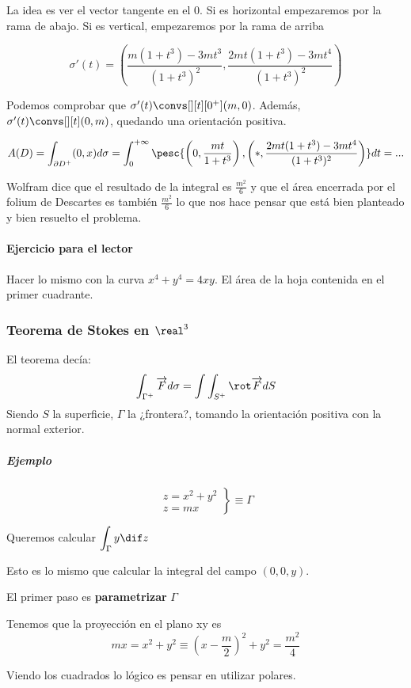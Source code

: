 La idea es ver el vector tangente en el 0. Si es horizontal empezaremos por la rama de abajo. Si es vertical, empezaremos por la rama de arriba

\[\sigma'(t) = \left(\frac{m(1+t^3)-3mt^3}{(1+t^3)^2},\frac{2mt(1+t^3) - 3mt^4}{(1+t^3)^2}\right)\]

Podemos comprobar que $\sigma'(t) \convs[][t][0^+] (m,0)$. Además, $\sigma'(t) \convs[][t](0,m)$, quedando una orientación positiva.

\[
A(D) = \int_{\partial  D^+} (0,x)d\sigma = \int_0^{+\infty} \pesc{\left(0,\frac{mt}{1+t^3}\right), \left(\ast,\frac{2mt(1+t^3)-3mt^4}{(1+t^3)^2}\right)}dt = ...
\]

Wolfram dice que el resultado de la integral es $\frac{m^2}{6}$ y que el área encerrada por el folium de Descartes es también $\frac{m^2}{6}$ lo que nos hace pensar que está bien planteado y bien resuelto el problema.


\paragraph{Ejercicio para el lector} Hacer lo mismo con la curva $x^4+y^4=4xy$. El área de la hoja contenida en el primer cuadrante.

\subsubsection{Teorema de Stokes en $\real^3$}

El teorema decía: \[
\int_{\Gamma^+}\overrightarrow{F}d\sigma = \int \int_{S^+} \rot\overrightarrow{F} dS
\]
Siendo $S$ la superficie, $\Gamma$ la ¿frontera?, tomando la orientación positiva con la normal exterior.

\subparagraph{Ejemplo}
\[
\left.\begin{array}{cc}
z=x^2+y^2\\
z=mx \end{array} \right\} \equiv \Gamma
\]

Queremos calcular $\displaystyle \int_{\Gamma}y \dif z$

Esto es lo mismo que calcular la integral del campo $(0,0,y)$.

El primer paso es \textbf{parametrizar} $\Gamma$

Tenemos que la proyección en el plano xy es \[mx=x^2+y^2 \equiv \left(x-\frac{m}{2}\right)^2 + y^2 = \frac{m^2}{4}\]

Viendo los cuadrados lo lógico es pensar en utilizar polares.

